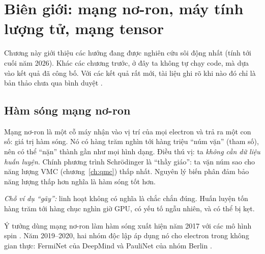 \chapter{Biên giới: mạng nơ-ron, máy tính lượng tử, mạng tensor}
\label{ch:biengioi}

Chương này giới thiệu các hướng đang được nghiên cứu sôi động nhất (tính tới cuối năm 2026). Khác các chương trước, ở đây ta không tự chạy code, mà dựa vào kết quả đã công bố. Với các kết quả rất mới, tài liệu ghi rõ khi nào đó chỉ là bản thảo chưa qua bình duyệt .

\section{Hàm sóng mạng nơ-ron}

\begin{eli5}
Mạng nơ-ron là một cỗ máy nhận vào vị trí của mọi electron và trả ra một con số: giá trị hàm sóng. Nó có hàng trăm nghìn tới hàng triệu ``núm vặn'' (tham số), nên có thể ``nặn'' thành gần như mọi hình dạng. Điều thú vị: ta \emph{không cần dữ liệu huấn luyện}. Chính phương trình Schrödinger là ``thầy giáo'': ta vặn núm sao cho năng lượng VMC (chương~\ref{ch:qmc}) thấp nhất. Nguyên lý biến phân đảm bảo năng lượng thấp hơn nghĩa là hàm sóng tốt hơn.

\emph{Chỗ ví dụ ``gãy'':} linh hoạt không có nghĩa là chắc chắn đúng. Huấn luyện tốn hàng trăm tới hàng chục nghìn giờ GPU, có yếu tố ngẫu nhiên, và có thể bị kẹt.
\end{eli5}

Ý tưởng dùng mạng nơ-ron làm hàm sóng xuất hiện năm 2017 với các mô hình spin \cite{Carleo2017}. Năm 2019--2020, hai nhóm độc lập áp dụng nó cho electron trong không gian thực: FermiNet của DeepMind \cite{Pfau2020} và PauliNet của nhóm Berlin \cite{Hermann2020}.

